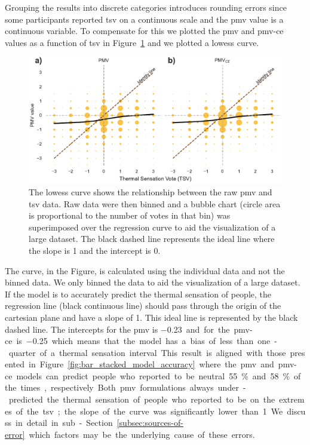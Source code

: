 Grouping the results into discrete categories introduces rounding errors since some participants reported \ac{tsv} on a continuous scale and the \ac{pmv} value is a continuous variable.
To compensate for this we plotted the \ac{pmv} and \ac{pmv-ce} values as a function of \ac{tsv} in Figure~\ref{fig:bubble_models_vs_tsv} and we plotted a \ac{lowess} curve.
\begin{figure}[htb!]
    \centering
    \includegraphics[width=\textwidth]{figures/bubble_models_vs_tsv}
    \caption{The \ac{lowess} curve shows the relationship between the raw \ac{pmv} and \ac{tsv} data.
    Raw data were then binned and a bubble chart (circle area is proportional to the number of votes in that bin) was superimposed over the regression curve to aid the visualization of a large dataset.
    The black dashed line represents the ideal line where the slope is 1 and the intercept is 0.}
    \label{fig:bubble_models_vs_tsv}
\end{figure}
The curve, in the Figure, is calculated using the individual data and not the binned data.
We only binned the data to aid the visualization of a large dataset.
If the model is to accurately predict the thermal sensation of people, the regression line (black continuous line) should pass through the origin of the cartesian plane and have a slope of 1.
This ideal line is represented by the black dashed line.
The intercepts for the \ac{pmv} is \qty{-0.23} and for the \ac{pmv-ce} is \qty{-0.25} which means that the model has a bias of less than one-quarter of a thermal sensation interval.
This result is aligned with those presented in Figure~\ref{fig:bar_stacked_model_accuracy} where the \ac{pmv} and \ac{pmv-ce} models can predict people who reported to be neutral \qty{55}{\percent} and \qty{58}{\percent} of the times, respectively.
Both \ac{pmv} formulations always under-predicted the thermal sensation of people who reported to be on the extremes of the \ac{tsv};
the slope of the curve was significantly lower than 1.
We discuss in detail in sub-Section~\ref{subsec:sources-of-error} which factors may be the underlying cause of these errors.

